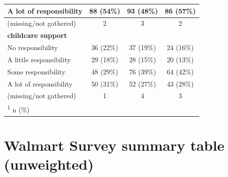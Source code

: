\documentclass[
  11pt,
  oneside]{article}
\begin{document}
\begin{table}
\begin{tabular}[t]{l|c|c|c}
\hline
\hspace{1em}A lot of responsibility & 88 (54\%) & 93 (48\%) & 86 (57\%)\\
\hline
\hspace{1em}(missing/not gathered) & 2 & 3 & 2\\
\hline
\textbf{childcare support} &  &  & \\
\hline
\hspace{1em}No responsibility & 36 (22\%) & 37 (19\%) & 24 (16\%)\\
\hline
\hspace{1em}A little responsibility & 29 (18\%) & 28 (15\%) & 20 (13\%)\\
\hline
\hspace{1em}Some responsibility & 48 (29\%) & 76 (39\%) & 64 (42\%)\\
\hline
\hspace{1em}A lot of responsibility & 50 (31\%) & 52 (27\%) & 43 (28\%)\\
\hline
\hspace{1em}(missing/not gathered) & 1 & 4 & 3\\
\hline
\multicolumn{4}{l}{\rule{0pt}{1em}\textsuperscript{1} n (\%)}\\
\end{tabular}
\end{table}

\FloatBarrier
\newpage

\section{Walmart Survey summary table (unweighted)}\label{app-wmt-survsum}
\end{document}
